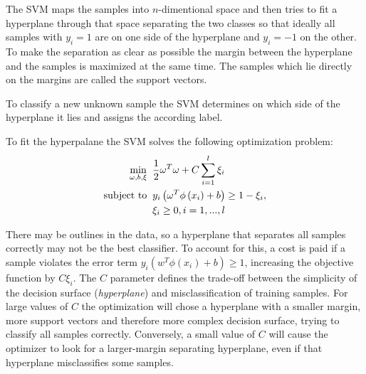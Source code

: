 The SVM maps the samples into \(n\)-dimentional space and then tries to fit a hyperplane through that space separating the two classes so that ideally all samples with \(y_{i}=1\) are on one side of the hyperplane and \(y_{i}=-1\) on the other. To make the separation as clear as possible the margin between the hyperplane and the samples is maximized at the same time. The samples which lie directly on the margins are called the support vectors.

To classify a new unknown sample the SVM determines on which side of the hyperplane it lies and assigns the according label.

To fit the hyperpalane the SVM solves the following optimization problem\cite{chang2011libsvm}:
\begin{equation}
\begin{split}
\min_{\omega , b ,\xi}\;\; & \frac{1}{2}\omega^{T}\omega +C\sum_{i=1}^{l}\xi_{i}\\
\textup{subject to}\;\; & y_{i}\left ( \omega^{T}\phi \left ( x_{i} \right )+b \right )\geq 1-\xi_{i},\\
& \xi_{i}\geq 0,i=1,...,l
\end{split}
\end{equation}

There may be outlines in the data, so a hyperplane that separates all samples correctly may not be the best classifier. To account for this, a cost is paid if a sample violates the error term \(y_{i}\left ( w^{T}\phi \left ( x_{i} \right )+b \right )\geq 1\), increasing the objective function by \(C \xi_{i}\). The $C$ parameter defines the trade-off between the simplicity of the decision surface (\emph{hyperplane}) and misclassification of training samples. For large values of $C$ the optimization will chose a hyperplane with a smaller margin, more support vectors and therefore more complex decision surface, trying to classify all samples correctly. Conversely, a small value of $C$ will cause the optimizer to look for a larger-margin separating hyperplane, even if that hyperplane misclassifies some samples\cite{crossValidatedSVMC}.

